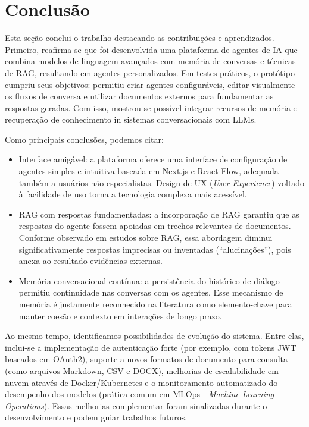 \documentclass[12pt, openright, oneside, a4paper, brazil]{ads-unipac-abntex2}
\begin{document}
\chapter[Conclusão]{Conclusão}
Esta seção conclui o trabalho destacando as contribuições e aprendizados. Primeiro, reafirma-se que foi desenvolvida uma plataforma de agentes de IA que combina modelos de linguagem avançados com memória de conversas e técnicas de RAG, resultando em agentes personalizados. Em testes práticos, o protótipo cumpriu seus objetivos: permitiu criar agentes configuráveis, editar visualmente os fluxos de conversa e utilizar documentos externos para fundamentar as respostas geradas. Com isso, mostrou-se possível integrar recursos de memória e recuperação de conhecimento in sistemas conversacionais com LLMs.

Como principais conclusões, podemos citar:

\begin{itemize}
    \item Interface amigável: a plataforma oferece uma interface de configuração de agentes simples e intuitiva baseada em Next.js e React Flow, adequada também a usuários não especialistas. Design de UX (\textit{User Experience}) voltado à facilidade de uso torna a tecnologia complexa mais acessível.
    \item RAG com respostas fundamentadas: a incorporação de RAG garantiu que as respostas do agente fossem apoiadas em trechos relevantes de documentos. Conforme observado em estudos sobre RAG, essa abordagem diminui significativamente respostas imprecisas ou inventadas (``alucinações''), pois anexa ao resultado evidências externas.
    \item Memória conversacional contínua: a persistência do histórico de diálogo permitiu continuidade nas conversas com os agentes. Esse mecanismo de memória é justamente reconhecido na literatura como elemento-chave para manter coesão e contexto em interações de longo prazo.
\end{itemize}
Ao mesmo tempo, identificamos possibilidades de evolução do sistema. Entre elas, inclui-se a implementação de autenticação forte (por exemplo, com tokens JWT baseados em OAuth2), suporte a novos formatos de documento para consulta (como arquivos Markdown, CSV e DOCX), melhorias de escalabilidade em nuvem através de Docker/Kubernetes e o monitoramento automatizado do desempenho dos modelos (prática comum em MLOps - \textit{Machine Learning Operations}). Essas melhorias complementar foram sinalizadas durante o desenvolvimento e podem guiar trabalhos futuros.
\end{document}
